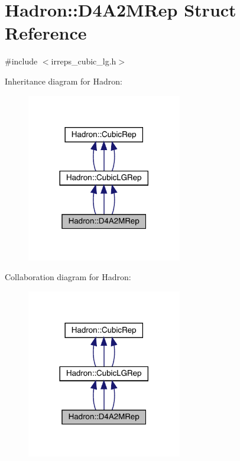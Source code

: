 \hypertarget{structHadron_1_1D4A2MRep}{}\section{Hadron\+:\+:D4\+A2\+M\+Rep Struct Reference}
\label{structHadron_1_1D4A2MRep}


{\ttfamily \#include $<$irreps\+\_\+cubic\+\_\+lg.\+h$>$}



Inheritance diagram for Hadron\+:
\nopagebreak
\begin{figure}[H]
\begin{center}
\leavevmode
\includegraphics[width=192pt]{d7/d19/structHadron_1_1D4A2MRep__inherit__graph}
\end{center}
\end{figure}


Collaboration diagram for Hadron\+:
\nopagebreak
\begin{figure}[H]
\begin{center}
\leavevmode
\includegraphics[width=192pt]{d4/d54/structHadron_1_1D4A2MRep__coll__graph}
\end{center}
\end{figure}

